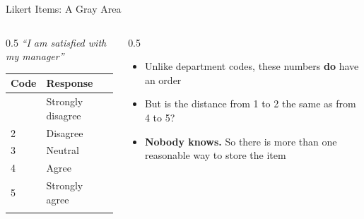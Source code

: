 \documentclass[
  ignorenonframetext,
  aspectratio=169,
]{beamer}
\providecommand{\tightlist}{%
  \setlength{\itemsep}{0pt}\setlength{\parskip}{0pt}}\usepackage{longtable,booktabs,array}
\begin{document}
\begin{frame}{Likert Items: A Gray Area}
\protect\hypertarget{sec-likert}{}
\begin{columns}[T]
\begin{column}{0.5\textwidth}
\emph{``I am satisfied with my manager''}

\begin{longtable}[]{@{}ll@{}}
\toprule\noalign{}
Code & Response \\
\midrule\noalign{}
\endhead
1 & Strongly disagree \\
2 & Disagree \\
3 & Neutral \\
4 & Agree \\
5 & Strongly agree \\
\bottomrule\noalign{}
\end{longtable}
\end{column}

\begin{column}{0.5\textwidth}
\begin{itemize}
\tightlist
\item
  Unlike department codes, these numbers \textbf{do} have an order
\item
  But is the distance from 1 to 2 the same as from 4 to 5?
\item
  \textbf{Nobody knows.} So there is more than one reasonable way to
  store the item
\end{itemize}
\end{column}
\end{columns}
\end{frame}
\end{document}
